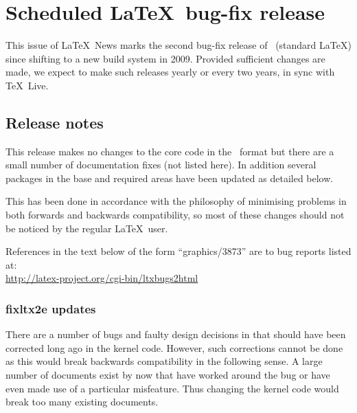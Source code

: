 \documentclass{ltnews}
\begin{document}
\maketitle

\section{Scheduled \LaTeX\ bug-fix release}

This issue of \LaTeX~News marks the second bug-fix release of
\LaTeXe\ (standard \LaTeX) since shifting to a new build system in 2009.
Provided sufficient changes are made, we expect to
make such releases yearly or every two years, in sync with \TeX\ Live.



\subsection{Release notes}

This release makes no changes to the core code in the \LaTeXe\ format
but there are a small number of documentation fixes (not listed
here). In addition several packages in the \textsf{base} and
\textsf{required} areas have been updated as detailed below.


This has been done in accordance with the philosophy of minimising
problems in both forwards and backwards compatibility, so most of
these changes should not be noticed by the regular \LaTeX\ user.

References in the text below of the form ``graphics/3873'' are to
bug reports listed
at:\\ \url{http://latex-project.org/cgi-bin/ltxbugs2html}


\let\paragraph\subsubsection

\paragraph{\textsf{fixltx2e} updates}



There are a number of bugs and faulty design decisions in \LaTeXe{}
that should have been corrected long ago in the kernel code.  However,
such corrections cannot be done as this would break backwards
compatibility in the following sense. A large number of documents
exist by now that have worked around the bug or have even made use of
a particular misfeature.  Thus changing the kernel code would break
too many existing documents.
\end{document}

